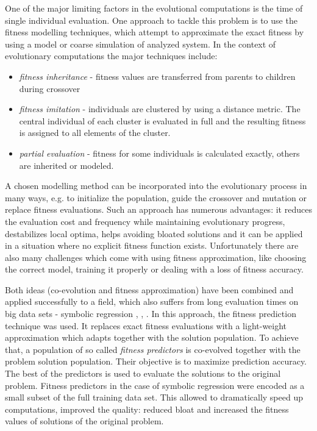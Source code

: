 \documentclass{llncs}
\begin{document}
One of the major limiting factors in the evolutional computations is the time of single individual evaluation. One approach to tackle this problem is to use the fitness modelling \cite{Jin2005} techniques, which attempt to approximate the exact fitness by using a model or coarse simulation of analyzed system. In the context of evolutionary computations the major techniques include:

\begin{itemize}
\item \emph{fitness inheritance} - fitness values are transferred from parents to children during crossover 
\item \emph{fitness imitation} - individuals are clustered by using a distance metric. The central individual of each cluster is evaluated in full and the resulting fitness is assigned to all elements of the cluster. 
\item \emph{partial evaluation} - fitness for some individuals is calculated exactly, others are inherited or modeled.
\end{itemize}

A chosen modelling method can be incorporated into the evolutionary process in many ways, e.g. to initialize the population, guide the crossover and mutation or replace fitness evaluations. Such an approach has numerous advantages: it reduces the evaluation cost and frequency while maintaining evolutionary progress, destabilizes local optima, helps avoiding bloated solutions and it can be applied in a situation where no explicit fitness function exists. Unfortunately there are also many challenges which come with using fitness approximation, like choosing the correct model, training it properly or dealing with a loss of fitness accuracy.

Both ideas (co-evolution and fitness approximation) have been combined and applied successfully to a field, which also suffers from long evaluation times on big data sets - symbolic regression \cite{Schmidt2009}, \cite{Schmidt2006}, \cite{Schmidt2008}. In this approach, the fitness prediction technique was used. It replaces exact fitness evaluations with a light-weight approximation which adapts together with the solution population. To achieve that, a population of so called \emph{fitness predictors} is co-evolved together with the problem solution population. Their objective is to maximize prediction accuracy. The best of the predictors is used to evaluate the solutions to the original problem. Fitness predictors in the case of symbolic regression were encoded as a small subset of the full training data set. This allowed to dramatically speed up computations, improved the quality: reduced bloat and increased the fitness values of solutions of the original problem.
\end{document}
